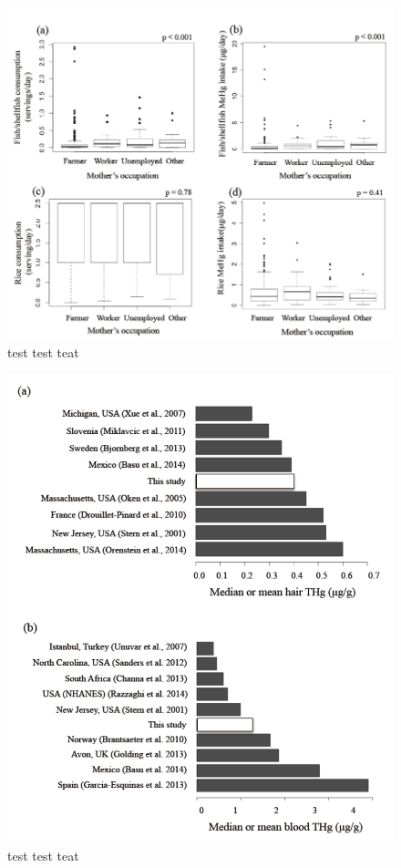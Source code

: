 \begin{figure}
  \centering
    \label{fig:Fig216}
  \includegraphics[scale=1]{Figures/Fig216.pdf}
  \caption[test caption]{test test teat}
\end{figure}


\begin{figure}
  \centering
    \label{fig:Fig217}
  \includegraphics[scale=1]{Figures/Fig217.pdf}
  \caption[test caption]{test test teat}
\end{figure}





















